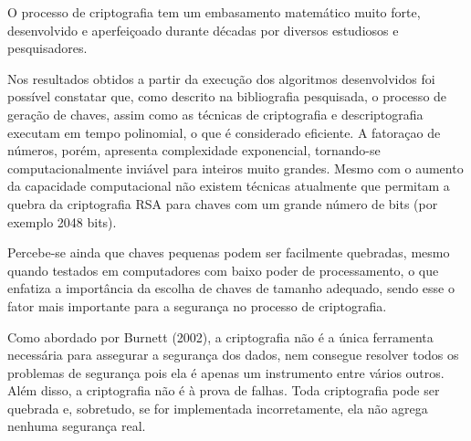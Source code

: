 

O processo de criptografia tem um embasamento matemático muito forte, desenvolvido e aperfeiçoado durante décadas por diversos estudiosos e pesquisadores.

Nos resultados obtidos a partir da execução dos algoritmos desenvolvidos foi possível constatar que, como descrito na bibliografia pesquisada, o processo de geração de chaves, assim como as técnicas de criptografia e descriptografia executam em tempo polinomial, o que é considerado eficiente. A fatoraçao de números, porém, apresenta complexidade exponencial, tornando-se computacionalmente inviável para inteiros muito grandes. Mesmo com o aumento da capacidade computacional não existem técnicas atualmente que permitam a quebra da criptografia RSA para chaves com um grande número de bits (por exemplo 2048 bits).

Percebe-se ainda que chaves pequenas podem ser facilmente quebradas, mesmo quando testados em computadores com baixo poder de processamento, o que enfatiza a importância da escolha de chaves de tamanho adequado, sendo esse o fator mais importante para a segurança no processo de criptografia.

Como abordado por Burnett (2002), a criptografia não é a única ferramenta necessária para assegurar a segurança dos dados, nem consegue resolver todos os problemas de segurança pois ela é apenas um instrumento entre vários outros. Além disso, a criptografia não é à prova de falhas. Toda criptografia pode ser quebrada e, sobretudo, se for implementada incorretamente, ela não agrega nenhuma segurança real.
